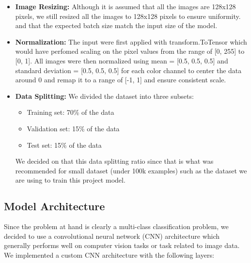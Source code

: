\documentclass[10pt]{article}
\begin{document}
\begin{itemize}
    \item \textbf{Image Resizing:} Although it is assumed that all the images are 128x128 pixels, we still resized all the images to 128x128 pixels to ensure uniformity.
    and that the expected batch size match the input size of the model.
    
    \item \textbf{Normalization:} The input were first applied with transform.ToTensor which would have perfomed scaling on the pixel values from the range of [0, 255] to [0, 1]. 
    All images were then normalized using mean = [0.5, 0.5, 0.5] and standard deviation = [0.5, 0.5, 0.5] for each color channel to center the data around 0 and remap it to a range of 
    [-1, 1] and ensure consistent scale.
    
    \item \textbf{Data Splitting:} We divided the dataset into three subsets:
    \begin{itemize}
        \item Training set: 70\% of the data
        \item Validation set: 15\% of the data
        \item Test set: 15\% of the data
    \end{itemize}
    We decided on that this data splitting ratio since that is what was recommended for small dataset (under 100k examples) such as the dataset we are using to train this project model.
\end{itemize}

\subsection{Model Architecture}

Since the problem at hand is clearly a multi-class classification problem, we decided to use a convolutional neural network (CNN) architecture which generally performs well on computer vision tasks
or task related to image data. We implemented a custom CNN architecture with the following layers:
\end{document}
